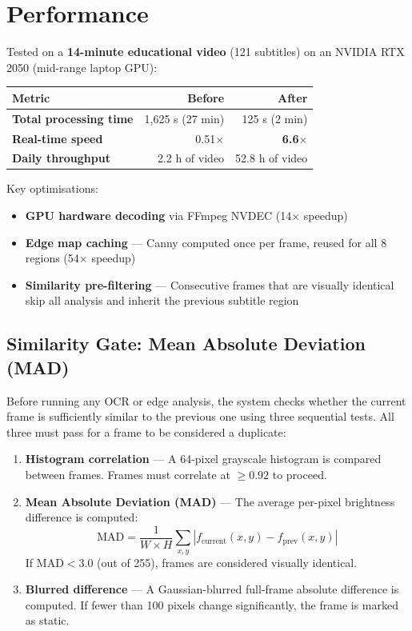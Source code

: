 \documentclass[11pt]{article}
\begin{document}
\section{Performance}
Tested on a \textbf{14-minute educational video} (121 subtitles) on an NVIDIA RTX 2050 (mid-range laptop GPU):

\begin{center}
\begin{tabularx}{0.8\textwidth}{>{\bfseries}l r r}
\toprule
Metric & Before & After \\
\midrule
Total processing time & 1,625 s (27 min) & 125 s (2 min) \\
Real-time speed & 0.51$\times$ & \textbf{6.6$\times$} \\
Daily throughput & 2.2 h of video & 52.8 h of video \\
\bottomrule
\end{tabularx}
\end{center}

Key optimisations:
\begin{itemize}[leftmargin=1.5em, itemsep=2pt]
    \item \textbf{GPU hardware decoding} via FFmpeg NVDEC (14$\times$ speedup)
    \item \textbf{Edge map caching} --- Canny computed once per frame, reused for all 8 regions (54$\times$ speedup)
    \item \textbf{Similarity pre-filtering} --- Consecutive frames that are visually identical skip all analysis and inherit the previous subtitle region
\end{itemize}

\subsection*{Similarity Gate: Mean Absolute Deviation (MAD)}
Before running any OCR or edge analysis, the system checks whether the current frame is sufficiently similar to the previous one using three sequential tests. All three must pass for a frame to be considered a duplicate:

\begin{enumerate}[leftmargin=1.5em, itemsep=2pt]
    \item \textbf{Histogram correlation} --- A 64-pixel grayscale histogram is compared between frames. Frames must correlate at $\geq 0.92$ to proceed.
    \item \textbf{Mean Absolute Deviation (MAD)} --- The average per-pixel brightness difference is computed:
    \[
    \text{MAD} = \frac{1}{W \times H} \sum_{x,y} \left| f_{\text{current}}(x,y) - f_{\text{prev}}(x,y) \right|
    \]
    If $\text{MAD} < 3.0$ (out of 255), frames are considered visually identical.
    \item \textbf{Blurred difference} --- A Gaussian-blurred full-frame absolute difference is computed. If fewer than 100 pixels change significantly, the frame is marked as static.
\end{enumerate}
\end{document}
